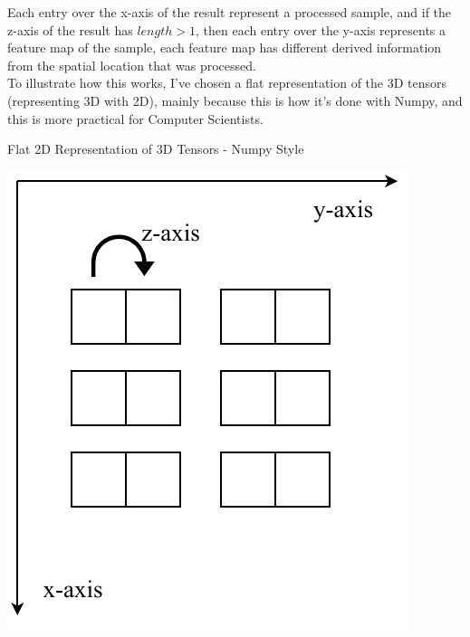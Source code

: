 \documentclass[a4paper, 12pt]{report}
\begin{document}
Each entry over the x-axis of the result represent a processed sample, and if the z-axis of the result has $ length > 1 $, then each entry over the y-axis represents a feature map of the sample, each feature map has different derived information from the spatial location that was processed.\\
To illustrate how this works, I've chosen a flat representation of the 3D tensors (representing 3D with 2D), mainly because this is how it's done with Numpy, and this is more practical for Computer Scientists.
\begin{blockfigure}{Flat 2D Representation of 3D Tensors - Numpy Style}
		\begin{center}
			\includegraphics[height=0.21\textheight]{numpy-3Dtensor-axis}
		\end{center}
\end{blockfigure}
\newpage
\end{document}
